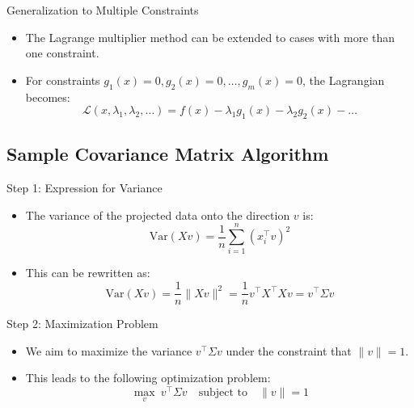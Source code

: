 \documentclass[serif, aspectratio=169]{beamer}
\begin{document}
\begin{frame}{Generalization to Multiple Constraints}
    \begin{itemize}
    \item The Lagrange multiplier method can be extended to cases with more than one constraint.
    \item For constraints $g_1(x) = 0, g_2(x) = 0, \dots, g_m(x) = 0$, the Lagrangian becomes:
    \[
    \mathcal{L}(x, \lambda_1, \lambda_2, \dots) = f(x) - \lambda_1 g_1(x) - \lambda_2 g_2(x) - \dots
    \]
    \end{itemize}
\end{frame}

\subsection{Sample Covariance Matrix Algorithm}

\begin{frame}{Step 1: Expression for Variance}
    \begin{itemize}
        \item The variance of the projected data onto the direction \( v \) is:
        \[
        \text{Var}(Xv) = \frac{1}{n} \sum_{i=1}^{n} (x_i^\top v)^2
        \]
        \item This can be rewritten as:
        \[
        \text{Var}(Xv) = \frac{1}{n} \|Xv\|^2 = \frac{1}{n} v^\top X^\top X v = v^\top \Sigma v
        \]
    \end{itemize}
\end{frame}

\begin{frame}{Step 2: Maximization Problem}
    \begin{itemize}
        \item We aim to maximize the variance \( v^\top \Sigma v \) under the constraint that \( \|v\| = 1 \).
        \item This leads to the following optimization problem:
        \[
        \max_{v} \ v^\top \Sigma v \quad \text{subject to} \quad \|v\| = 1
        \]
    \end{itemize}
\end{frame}
\end{document}
